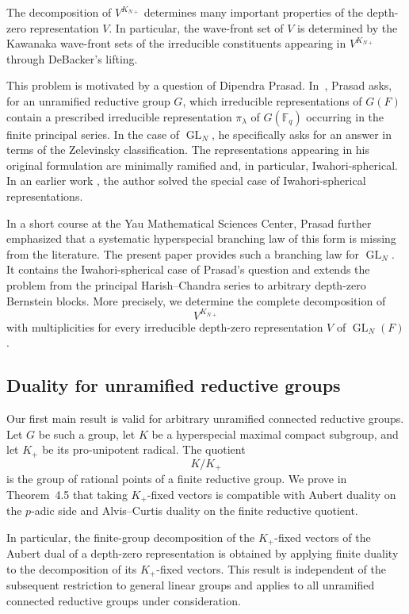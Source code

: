 \documentclass[12pt]{article}
\theoremstyle{remark}
\begin{document}
The decomposition of \(V^{K_{N+}}\) determines many important
properties of the depth-zero representation \(V\). In particular,
the wave-front set of \(V\) is determined by the Kawanaka
wave-front sets of the irreducible constituents appearing in
\(V^{K_{N+}}\) through DeBacker's lifting.

This problem is motivated by a question of Dipendra Prasad.
In~\cite{Prasad2025}, Prasad asks, for an unramified
reductive group \(G\), which irreducible representations of
\(G(F)\) contain a prescribed irreducible representation
\(\pi_\lambda\) of \(G(\mathbb F_q)\) occurring in the finite
principal series. In the case of \(\operatorname{GL}_N\), he
specifically asks for an answer in terms of the Zelevinsky
classification. The representations appearing in his original
formulation are minimally ramified and, in particular,
Iwahori-spherical. In an earlier work \cite{WangIwahori}, the author solved the special case of Iwahori-spherical representations.


In a short course at the Yau Mathematical Sciences Center,
Prasad further emphasized that a systematic hyperspecial
branching law of this form is missing from the literature. The
present paper provides such a branching law for
\(\operatorname{GL}_N\). It contains the Iwahori-spherical case
of Prasad's question and extends the problem from the principal
Harish--Chandra series to arbitrary depth-zero Bernstein blocks.
More precisely, we determine the complete decomposition of
$$
V^{K_{N+}}
$$
with multiplicities for every irreducible depth-zero
representation \(V\) of \(\operatorname{GL}_N(F)\).

\subsection*{Duality for unramified reductive groups}

Our first main result is valid for arbitrary unramified connected
reductive groups. Let \(G\) be such a group, let \(K\) be a
hyperspecial maximal compact subgroup, and let \(K_+\) be its
pro-unipotent radical. The quotient
$$
K/K_+
$$
is the group of rational points of a finite reductive group.
We prove in Theorem~4.5 that taking \(K_+\)-fixed vectors is
compatible with Aubert duality on the \(p\)-adic side and
Alvis--Curtis duality on the finite reductive quotient.

In particular, the finite-group decomposition of the
\(K_+\)-fixed vectors of the Aubert dual of a depth-zero
representation is obtained by applying finite duality to the
decomposition of its \(K_+\)-fixed vectors. This result is
independent of the subsequent restriction to general linear
groups and applies to all unramified connected reductive groups
under consideration.
\end{document}
